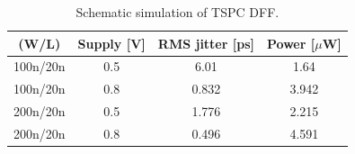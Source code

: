 


		\begin{table}[h!]
			\centering
			\def\arraystretch{1.5}		
			\setlength\arrayrulewidth{0.75pt}
			\setlength{\tabcolsep}{1em} %
			\begin{tabular}{|c|c|c|c|}
				\hline 
				\rule[-1ex]{0pt}{2.5ex} \cellcolor{gray!40}\textbf{(W/L)} & \cellcolor{gray!40}\textbf{Supply [V]} & \cellcolor{gray!40}\textbf{RMS jitter [ps]}& \cellcolor{gray!40}\textbf{Power [$\mu$W]}\\ 
				\hline 
				\rule[-1ex]{0pt}{2.5ex} 100n/20n  & 0.5 & 6.01 & 1.64\\ 
				\hline 
				\rule[-1ex]{0pt}{2.5ex} 100n/20n  & 0.8 & 0.832  & 3.942\\ 
				\hline 
				\rule[-1ex]{0pt}{2.5ex} 200n/20n  & 0.5 & 1.776 & 2.215 \\ 
				\hline 
				\rule[-1ex]{0pt}{2.5ex} 200n/20n  & 0.8 & 0.496  & 4.591 \\ 
				\hline 
			\end{tabular} 
			\caption{Schematic simulation of TSPC DFF.}
			\label{tab:dff}
		\end{table}   







